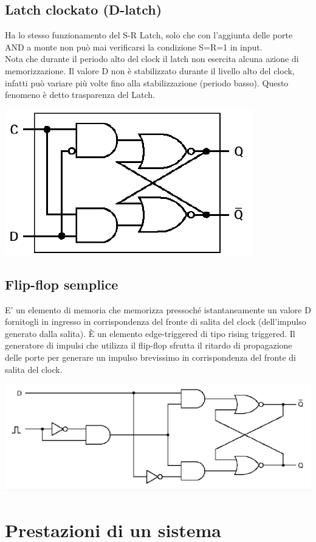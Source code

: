 \documentclass[italian]{article}
\begin{document}
	\subsection{Latch clockato (D-latch)}
	Ha lo stesso funzionamento del S-R Latch, solo che con l'aggiunta delle porte AND a monte non può mai verificarsi la condizione S=R=1 in input. \\[2mm]
	Nota che durante il periodo alto del clock il latch non esercita alcuna azione di memorizzazione. Il valore D non è stabilizzato durante il livello alto del clock, infatti può variare più volte fino alla stabilizzazione (periodo basso). Questo fenomeno è detto trasparenza del Latch.
	\begin{center}
		\includegraphics[width=0.3\linewidth]{slides/dlatch.png}
	\end{center}	

	\subsection{Flip-flop semplice}
	E' un elemento di memoria che memorizza pressoché istantaneamente un valore D fornitogli in ingresso in corrispondenza del fronte di salita del clock (dell’impulso generato dalla salita). È un elemento edge-triggered di tipo rising triggered. Il generatore di impulsi che utilizza il flip-flop sfrutta il ritardo di propagazione delle porte per generare un impulso brevissimo in corrispondenza del fronte di salita del clock.
	\begin{center}
		\includegraphics[width=0.6\linewidth]{slides/flip-flop.png}
	\end{center}
	
	\section{Prestazioni di un sistema}
\end{document}

